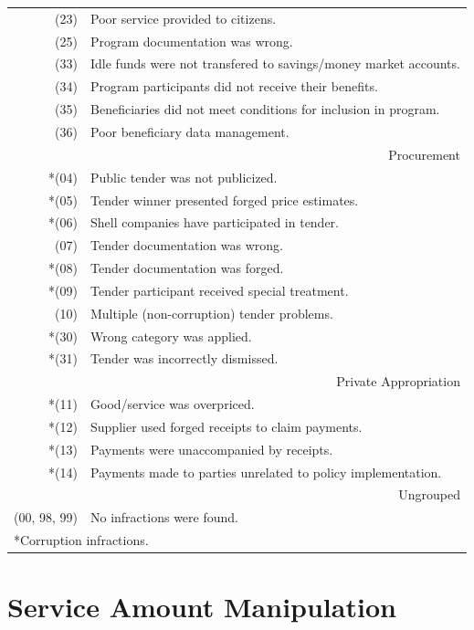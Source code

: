 \documentclass[11pt]{article}
\begin{document}
\begin{table}[!htbp]
\begin{tabular}{r|l}
   (23) & Poor service provided to citizens. \\
   (25) & Program documentation was wrong. \\
   (33) & Idle funds were not transfered to savings/money market accounts. \\
   (34) & Program participants did not receive their benefits. \\
   (35) & Beneficiaries did not meet conditions for inclusion in program. \\
   (36) & Poor beneficiary data management. \\
  \hline
  \multicolumn{2}{r}{Procurement} \\
  \hline
  *(04) & Public tender was not publicized. \\
  *(05) & Tender winner presented forged price estimates. \\
  *(06) & Shell companies have participated in tender. \\
   (07) & Tender documentation was wrong. \\
  *(08) & Tender documentation was forged. \\
  *(09) & Tender participant received special treatment. \\
   (10) & Multiple (non-corruption) tender problems. \\
  *(30) & Wrong category was applied. \\
  *(31) & Tender was incorrectly dismissed. \\
  \hline
  \multicolumn{2}{r}{Private Appropriation} \\
  \hline
  *(11) & Good/service was overpriced. \\
  *(12) & Supplier used forged receipts to claim payments. \\
  *(13) & Payments were unaccompanied by receipts. \\
  *(14) & Payments made to parties unrelated to policy implementation. \\
  \hline
  \multicolumn{2}{r}{Ungrouped} \\
  \hline
  (00, 98, 99) & No infractions were found. \\
  \hline

  \hline
  \multicolumn{2}{l}{*Corruption infractions.}
  \end{tabular}
\end{table}

\newpage

\section{Service Amount Manipulation}\label{sec:appendixC}
\end{document}
